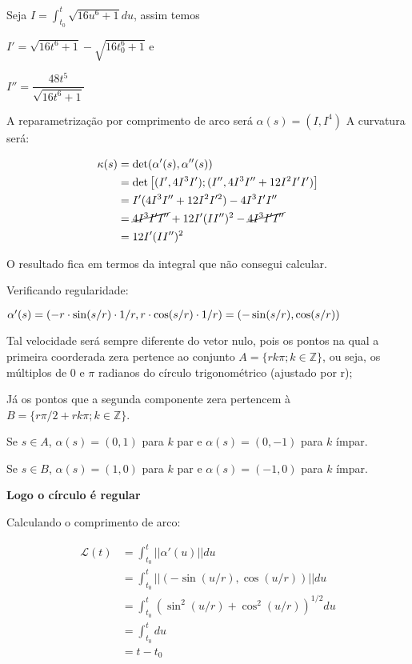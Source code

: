 \documentclass[12pt,letterpaper]{article}
\newcommand\lcur{\mathcal{L}}
\newcommand{\blue}[1]{{\color{blue}{#1}}}
\begin{document}
\begin{enumerate}
\begin{itemize}
		Seja $I=\int_{t_0}^{t}\sqrt{16u^6+1}du$, assim temos
		
		 $I'=\sqrt{16t^6+1}-\sqrt{16t_0^6+1}$ e
		 
		  $I''=\dfrac{48t^5}{\sqrt{16t^6+1}}$
		  
		 A reparametrização por comprimento de arco será $\alpha(s)=(I,I^4)$
		 A curvatura será:
		 
		 \begin{align*}
		 	\kappa(s)&=\det(\alpha'(s),\alpha''(s))\\
		 	&=\det\left[(I',4I^3I');(I'',4I^3I''+12I^2I'I')\right]\\
		 	&=I'(4I^3I''+12I^2I'^2)-4I^3I'I''\\
		 	&=\cancel{4I^3I'I''}+12I'(II'')^2-\cancel{4I^3I'I''}\\
		 	&=12I'(II'')^2
		 \end{align*}
	 
	 O resultado fica em termos da integral que não consegui calcular.		
	 
		\blue{
			\item (círculos) $\alpha(s)=(a+r\cdot\cos(s/r),b+r\cdot\sin(s/r)), s\in\mathbb{R},r>0;$}
		
		Verificando regularidade:
		
		$\alpha'(s)=(-r\cdot\sin(s/r)\cdot1/r,r\cdot\cos(s/r)\cdot1/r)\\=(-\sin(s/r),\cos(s/r))$
		
		Tal velocidade será sempre diferente do vetor nulo, pois os pontos na qual a primeira coorderada zera pertence ao conjunto $A=\{rk\pi;k\in\mathbb{Z}\}$, ou seja, os múltiplos de $0$ e $\pi$ radianos do círculo trigonométrico (ajustado por r);
		
		Já os pontos que a segunda componente zera pertencem à $B=\{r\pi/2+rk\pi;k\in\mathbb{Z}\}$.
		
		Se $s\in A$, $\alpha(s)=(0,1)$ para $k$ par e $\alpha(s)=(0,-1)$ para $k$ ímpar.
		
		Se $s\in B$, $\alpha(s)=(1,0)$ para $k$ par e $\alpha(s)=(-1,0)$ para $k$ ímpar.
		
		\textbf{Logo o círculo é regular}
		
		Calculando o comprimento de arco:
		
		\begin{align*}
			\lcur(t)&=\int_{t_0}^{t}||\alpha'(u)||du\\
			&=\int_{t_0}^{t}||(-\sin(u/r),\cos(u/r))||du\\
			&=\int_{t_0}^t(\sin^2(u/r)+\cos^2(u/r))^{1/2}du\\
			&=\int_{t_0}^tdu\\
			&=t-t_0
		\end{align*}
	

\end{itemize}
\end{enumerate}
\end{document}
